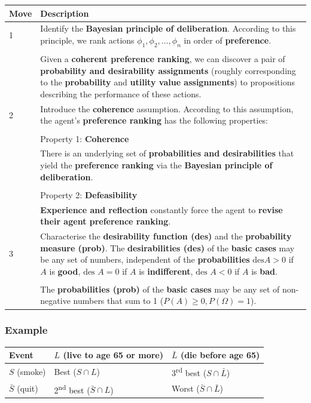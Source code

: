 \documentclass[11pt]{article}
\begin{document}
\begin{center}
\begin{tabular}{|m{2em}|m{28em}|}
\hline
Move & Description\\
\hline
1 & Identify the \textbf{Bayesian principle of deliberation}. According to this principle, we rank actions \(\phi_1, \phi_2, \ldots, \phi_n\) in order of \textbf{preference}.\\
 & \\
 & Given a \textbf{coherent preference ranking}, we can discover a pair of \textbf{probability and desirability assignments} (roughly corresponding to the \textbf{probability} and \textbf{utility value assignments}) to propositions describing the performance of these actions.\\
\hline
2 & Introduce the \textbf{coherence} assumption. According to this assumption, the agent's \textbf{preference ranking} has the following properties:\\
 & \\
 & Property 1: \textbf{Coherence}\\
 & There is an underlying set of \textbf{probabilities and desirabilities} that yield the \textbf{preference ranking} via the \textbf{Bayesian principle of deliberation}.\\
 & \\
 & Property 2: \textbf{Defeasibility}\\
 & \textbf{Experience and reflection} constantly force the agent to \textbf{revise their agent preference ranking}.\\
\hline
3 & Characterise the \textbf{desirability function (des)} and the \textbf{probability measure (prob)}. The \textbf{desirabilities (des)} of the \textbf{basic cases} may be any set of numbers, independent of the \textbf{probabilities} \(\text{des} A > 0\) if \(A\) is \textbf{good}, \(\text{des } A = 0\) if \(A\) is \textbf{indifferent}, \(\text{des } A < 0\) if \(A\) is \textbf{bad}.\\
 & \\
 & The \textbf{probabilities (prob)} of the \textbf{basic cases} may be any set of non-negative numbers that sum to 1 (\(P(A) \ge 0, P(\Omega) = 1\)).\\
\hline
\end{tabular}
\end{center}
\subsubsection{Example}
\label{sec:org8ad88d0}
\begin{center}
\begin{tabular}{l|l|l}
Event & \(L\) (live to age 65 or more) & \(\bar{L}\) (die before age 65)\\
\hline
\(S\) (smoke) & Best (\(S \cap L\)) & 3\textsuperscript{rd} best (\(S \cap \bar{L}\))\\
\hline
\(\bar{S}\) (quit) & 2\textsuperscript{nd} best (\(\bar{S} \cap L\)) & Worst (\(\bar{S} \cap \bar{L}\))\\
\end{tabular}
\end{center}
\end{document}
